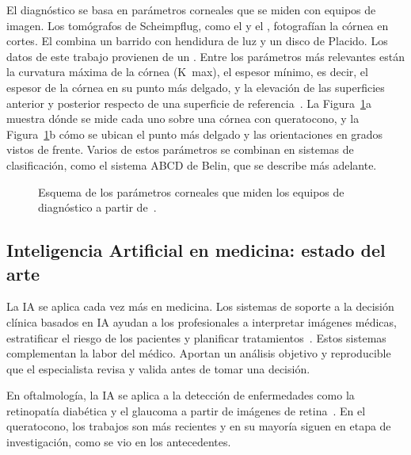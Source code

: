         El diagnóstico se basa en parámetros corneales que se miden con equipos de imagen. Los tomógrafos de Scheimpflug, como el \Pentacam{} y el \Sirius{}, fotografían la córnea en cortes. El \Orbscan{} combina un barrido con hendidura de luz y un disco de Placido. Los datos de este trabajo provienen de un \Orbscan{}. Entre los parámetros más relevantes están la curvatura máxima de la córnea (K~max), el espesor mínimo, es decir, el espesor de la córnea en su punto más delgado, y la elevación de las superficies anterior y posterior respecto de una superficie de referencia~\cite{kcn_parametros}. La Figura~\ref{fig:parametros_cornea}a muestra dónde se mide cada uno sobre una córnea con queratocono, y la Figura~\ref{fig:parametros_cornea}b cómo se ubican el punto más delgado y las orientaciones en grados vistos de frente. Varios de estos parámetros se combinan en sistemas de clasificación, como el sistema ABCD de Belin, que se describe más adelante.

        \begin{figure}[H] \centering
            \resizebox{\linewidth}{!}{}
            \caption[Esquema de los parámetros corneales que miden los equipos de diagnóstico.]{Esquema de los parámetros corneales que miden los equipos de diagnóstico a partir de~\cite{kcn_parametros, belin_abcd}.}
            \label{fig:parametros_cornea}
        \end{figure}

    \subsection{Inteligencia Artificial en medicina: estado del arte}

        La IA se aplica cada vez más en medicina. Los sistemas de soporte a la decisión clínica basados en IA ayudan a los profesionales a interpretar imágenes médicas, estratificar el riesgo de los pacientes y planificar tratamientos~\cite{medicina_ia}. Estos sistemas complementan la labor del médico. Aportan un análisis objetivo y reproducible que el especialista revisa y valida antes de tomar una decisión.

        En oftalmología, la IA se aplica a la detección de enfermedades como la retinopatía diabética y el glaucoma a partir de imágenes de retina~\cite{retfound}. En el queratocono, los trabajos son más recientes y en su mayoría siguen en etapa de investigación, como se vio en los antecedentes.

